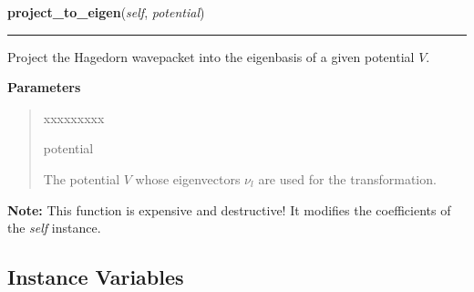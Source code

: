 \hspace{.8\funcindent}\begin{boxedminipage}{\funcwidth}

    \raggedright \textbf{project\_to\_eigen}(\textit{self}, \textit{potential})

    \vspace{-1.5ex}

    \rule{\textwidth}{0.5\fboxrule}
\setlength{\parskip}{2ex}
    Project the Hagedorn wavepacket into the eigenbasis of a given
    potential $V$.

\setlength{\parskip}{1ex}
      \textbf{Parameters}
      \vspace{-1ex}

      \begin{quote}
        \begin{Ventry}{xxxxxxxxx}

          \item[potential]

          The potential $V$ whose eigenvectors $\nu_l$ are used for the
          transformation.

        \end{Ventry}

      \end{quote}

\textbf{Note:} This function is expensive and destructive! It modifies the coefficients of
the \textit{self} instance.



    \end{boxedminipage}



  \subsection{Instance Variables}

